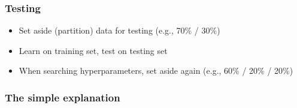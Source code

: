 \begin{frame}
  \frametitle{Testing}
  \begin{itemize}
  \item Set aside (partition) data for testing (e.g., 70\% / 30\%)
  \item Learn on training set, test on testing set
  \item When searching hyperparameters, set aside again (e.g., 60\% / 20\% / 20\%)
  \end{itemize}
\end{frame}


\begin{frame}
  \vspace{-9.7cm}
\end{frame}


\begin{frame}
  \frametitle{The simple explanation}
\end{frame}

\begin{frame}
\end{frame}


\begin{frame}
  \vspace{-4.8cm}
\end{frame}

